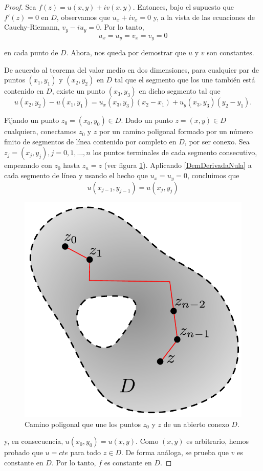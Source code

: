 \begin{proof}
Sea $f(z) = u(x,y) + i v(x,y)$. Entonces, bajo el supuesto que $f'(z) = 0$ en $D$, observamos que $u_x + i v_x = 0$ y, a la vista de las ecuaciones de Cauchy-Riemann, $v_y - iu_y = 0$. Por lo tanto,
$$u_x = u_y = v_x = v_y = 0$$

en cada punto de $D$. Ahora, nos queda por demostrar que $u$ y $v$ son constantes.

De acuerdo al teorema del valor medio en dos dimensiones, para cualquier par de puntos $(x_1,y_1)$ y $(x_2,y_2)$ en $D$ tal que el segmento que los une también está contenido en $D$, existe un punto $(x_3,y_3)$ en dicho segmento tal que
\begin{equation}
 u(x_2,y_2) - u(x_1,y_1) = u_x(x_3,y_3)(x_2 - x_1) + u_y(x_3,y_3)(y_2-y_1).    \label{DemDerivadaNula}
\end{equation}

Fijando un punto $z_0 = (x_0,y_0) \in D$. Dado un punto $z = (x,y) \in D$ cualquiera, conectamos $z_0$ y $z$ por un camino poligonal  formado por un número finito de segmentos de línea contenido por completo en $D$, por ser conexo. Sea $z_j = (x_j,y_j), j = 0,1,\dots,n$ los puntos terminales de cada segmento consecutivo, empezando con $z_0$ hasta $z_n = z$ (ver figura \ref{fig:DerivadaNula}). Aplicando \eqref{DemDerivadaNula} a cada segmento de línea y usando el hecho que $u_x = u_y = 0$, concluimos que 
$$u(x_{j-1},y_{j-1}) = u(x_j,y_j)$$

\begin{figure}[H]
    \centering
    \includegraphics[scale = 0.5]{Figuras/DerivadaNula.pdf}
    \caption{Camino poligonal que une los puntos $z_0$ y $z$ de un abierto conexo $D$.}
    \label{fig:DerivadaNula}
\end{figure}

y, en consecuencia, $u(x_0,y_0) = u(x,y)$. Como $(x,y)$ es arbitrario, hemos probado que $u = cte$ para todo $z \in D$. De forma análoga, se prueba que $v$ es constante en $D$. Por lo tanto, $f$ es constante en $D$.
\end{proof}

